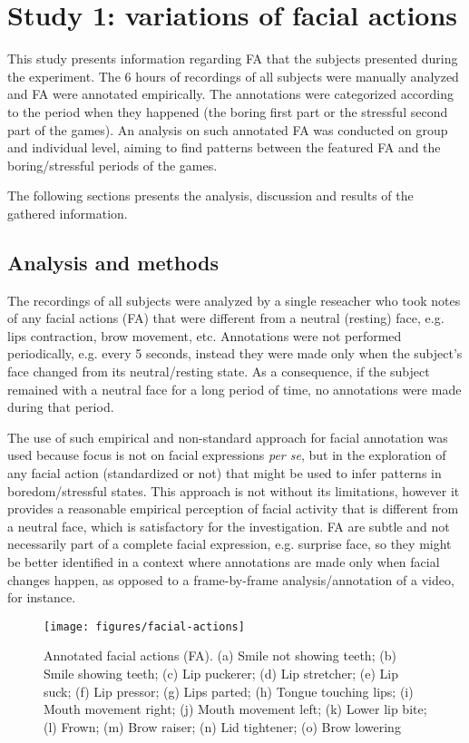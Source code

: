 \section{Study 1: variations of facial actions}

This study presents information regarding FA that the subjects presented during the experiment. The 6 hours of recordings of all subjects were manually analyzed and FA were annotated empirically. The annotations were categorized according to the period when they happened (the boring first part or the stressful second part of the games). An analysis on such annotated FA was conducted on group and individual level, aiming to find patterns between the featured FA and the boring/stressful periods of the games.

The following sections presents the analysis, discussion and results of the gathered information.

\subsection{Analysis and methods}
\label{s:experiment1-study1-methodology}

The recordings of all subjects were analyzed by a single reseacher who took notes of any facial actions (FA) that were different from a neutral (resting) face, e.g. lips contraction, brow movement, etc. Annotations were not performed periodically, e.g. every 5 seconds, instead they were made only when the subject's face changed from its neutral/resting state. As a consequence, if the subject remained with a neutral face for a long period of time, no annotations were made during that period.

The use of such empirical and non-standard approach for facial annotation was used because focus is not on facial expressions \textit{per se}, but in the exploration of any facial action (standardized or not) that might be used to infer patterns in boredom/stressful states. This approach is not without its limitations, however it provides a reasonable empirical perception of facial activity that is different from a neutral face, which is satisfactory for the investigation. FA are subtle and not necessarily part of a complete facial expression, e.g. surprise face, so they might be better identified in a context where annotations are made only when facial changes happen, as opposed to a frame-by-frame analysis/annotation of a video, for instance.

\begin{figure}[!h]
\centering
\texttt{[image: figures/facial-actions]}
\caption{Annotated facial actions (FA). (a) Smile not showing teeth; (b) Smile showing teeth; (c) Lip puckerer; (d) Lip stretcher; (e) Lip suck; (f) Lip pressor; (g) Lips parted; (h) Tongue touching lips; (i) Mouth movement right; (j) Mouth movement left; (k) Lower lip bite; (l) Frown; (m) Brow raiser; (n) Lid tightener; (o) Brow lowering}
\label{fig:fa}
\end{figure}

